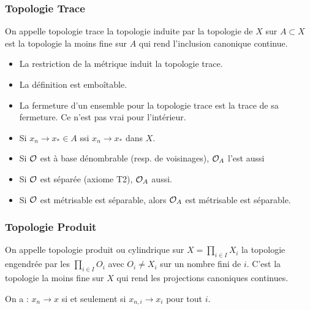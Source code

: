 \documentclass{cours}
\begin{document}
\subsubsection{Topologie Trace}
\begin{definition}
    On appelle topologie trace la topologie induite par la topologie de $X$ sur $A \subset X$ est la topologie la moins fine sur $A$ qui rend l'inclusion canonique continue.
\end{definition}
\begin{proposition}
    \begin{itemize}
        \item La restriction de la métrique induit la topologie trace.
        \item La définition est emboîtable.
        \item La fermeture d'un ensemble pour la topologie trace est la trace de sa fermeture. Ce n'est pas vrai pour l'intérieur.
        \item Si $x_{n} \rightarrow x_{*}\in A$ ssi $x_{n} \rightarrow x_{*}$ dans $X$.
    \end{itemize}
    \begin{itemize}
        \item Si $\mathcal{O}$ est à base dénombrable (resp. de voisinages), $\mathcal{O}_{A}$ l'est aussi
        \item Si $\mathcal{O}$ est séparée (axiome T2), $\mathcal{O}_{A}$ aussi.
        \item Si $\mathcal{O}$ est métrisable est séparable, alors $\mathcal{O}_{A}$ est métrisable est séparable.
    \end{itemize}
\end{proposition}

\subsubsection{Topologie Produit}
\begin{definition}
    On appelle topologie produit ou cylindrique sur $X = \prod_{i \in I} X_{i}$ la topologie engendrée par les $\prod_{i \in I}O_{i}$ avec $O_{i} \neq X_{i}$ sur un nombre fini de $i$. C'est la topologie la moins fine sur $X$ qui rend les projections canoniques continues.
\end{definition}
\begin{lemma}
    On a : $x_{n} \to x$ si et seulement si $x_{n, i} \to x_{i}$ pour tout $i$.
\end{lemma}
\end{document}
